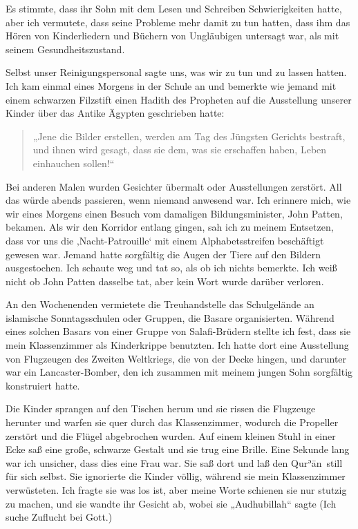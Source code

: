 \documentclass[12pt]{memoir}
\def\´{ʾ} %
\def \Quran{Qur\-\´ān} %
\def\–{\hskip0pt-\hskip0pt}
\begin{document}
Es stimmte, dass ihr Sohn mit dem Lesen und Schreiben Schwierigkeiten hatte,
aber ich vermutete, dass seine Probleme mehr damit zu tun hatten,
dass ihm das Hören von Kinderliedern und Büchern von Ungläubigen untersagt war,
als mit seinem Gesundheitszustand.

Selbst unser Reinigungspersonal sagte uns, was wir zu tun und zu lassen hatten.
Ich kam einmal eines Morgens in der Schule an
und bemerkte wie jemand mit einem schwarzen Filzstift
einen Hadith des Propheten
auf die Ausstellung unserer Kinder über das Antike Ägypten geschrieben hatte:

\begin{quote}
„Jene die Bilder erstellen, werden am Tag des Jüngsten Gerichts bestraft,
und ihnen wird gesagt, dass sie dem, was sie erschaffen haben,
Leben einhauchen sollen!“
\end{quote}

Bei anderen Malen wurden Gesichter übermalt oder Ausstellungen zerstört.
All das würde abends passieren, wenn niemand anwesend war.
Ich erinnere mich, wie wir eines Morgens einen Besuch
vom damaligen Bildungsminister, John Patten, bekamen.
Als wir den Korridor entlang gingen, sah ich zu meinem Entsetzen,
dass vor uns die ‚Nacht\–Patrouille‘ mit einem Alphabetsstreifen
beschäftigt gewesen war.
Jemand hatte sorgfältig die Augen der Tiere auf den Bildern ausgestochen.
Ich schaute weg und tat so, als ob ich nichts bemerkte.
Ich weiß nicht ob John Patten dasselbe tat,
aber kein Wort wurde darüber verloren.


An den Wochenenden vermietete die Treuhandstelle das Schulgelände
an islamische Sonntagsschulen oder Gruppen, die Basare organisierten.
Während eines solchen Basars von einer Gruppe von Salafi\–Brüdern
stellte ich fest, dass sie mein Klassenzimmer als Kinderkrippe benutzten.
Ich hatte dort eine Ausstellung von Flugzeugen des Zweiten Weltkriegs,
die von der Decke hingen, und darunter war ein Lancaster\–Bomber,
den ich zusammen mit meinem jungen Sohn sorgfältig konstruiert hatte.

Die Kinder sprangen auf den Tischen herum
und sie rissen die Flugzeuge herunter
und warfen sie quer durch das Klassenzimmer,
wodurch die Propeller zerstört und die Flügel abgebrochen wurden.
Auf einem kleinen Stuhl in einer Ecke saß eine große, schwarze Gestalt
und sie trug eine Brille.
Eine Sekunde lang war ich unsicher, dass dies eine Frau war.
Sie saß dort und laß den \Quran\ still für sich selbst.
Sie ignorierte die Kinder völlig, während sie mein Klassenzimmer verwüsteten.
Ich fragte sie was los ist,
aber meine Worte schienen sie nur stutzig zu machen,
und sie wandte ihr Gesicht ab, wobei sie „Audhubillah“ sagte
(Ich suche Zuflucht bei Gott.)
\end{document}
